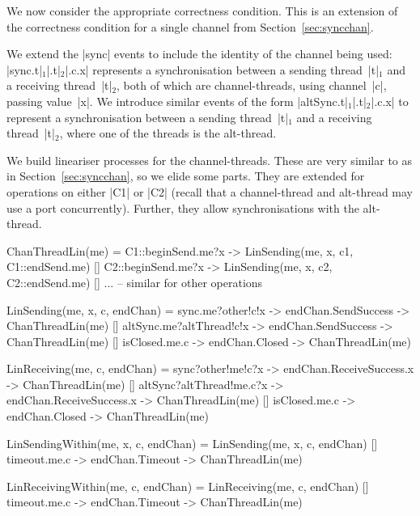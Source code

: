 
We now consider the appropriate correctness condition.   This is an extension
of the correctness condition for a single channel from
Section~\ref{sec:syncchan}. 

We extend the |sync| events to include the identity of the channel being used:
|sync.t|$_1$|.t|$_2$|.c.x| represents a synchronisation between a sending
thread~|t|$_1$ and a receiving thread~|t|$_2$, both of which are
channel-threads, using channel~|c|, passing value~|x|.
%
We introduce similar events of the form |altSync.t|$_1$|.t|$_2$|.c.x| to
represent a synchronisation between a sending thread~|t|$_1$ and a receiving
thread~|t|$_2$, where one of the threads is the alt-thread.

We build lineariser processes for the channel-threads.  These are very similar
to as in Section~\ref{sec:syncchan}, so we elide some parts.  They are
extended for operations on either |C1| or |C2| (recall that a channel-thread
and alt-thread may use a port concurrently).  Further, they allow
synchronisations with the alt-thread.
\begin{cspm}
ChanThreadLin(me) = 
  C1::beginSend.me?x -> LinSending(me, x, c1, C1::endSend.me)
  [] C2::beginSend.me?x -> LinSending(me, x, c2, C2::endSend.me)
  [] ... -- similar for other operations 

LinSending(me, x, c, endChan) = 
  sync.me?other!c!x -> endChan.SendSuccess -> ChanThreadLin(me)
  [] altSync.me?altThread!c!x -> endChan.SendSuccess -> ChanThreadLin(me)
  [] isClosed.me.c -> endChan.Closed -> ChanThreadLin(me)

LinReceiving(me, c, endChan) = 
  sync?other!me!c?x -> endChan.ReceiveSuccess.x -> ChanThreadLin(me)
  [] altSync?altThread!me.c?x -> endChan.ReceiveSuccess.x -> ChanThreadLin(me)
  [] isClosed.me.c -> endChan.Closed -> ChanThreadLin(me)

LinSendingWithin(me, x, c, endChan) = 
  LinSending(me, x, c, endChan)
  [] timeout.me.c -> endChan.Timeout -> ChanThreadLin(me)

LinReceivingWithin(me, c, endChan) = 
  LinReceiving(me, c, endChan)
  [] timeout.me.c -> endChan.Timeout -> ChanThreadLin(me) 
\end{cspm}

